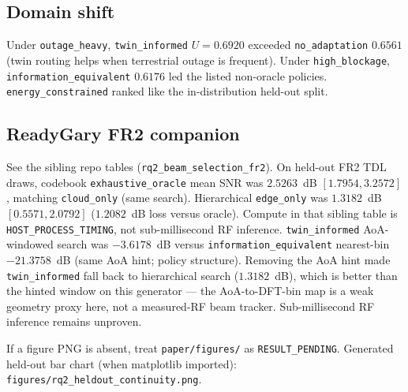 \subsection{Domain shift}


Under \texttt{outage\_heavy}, \texttt{twin\_informed} $U=0.6920$ exceeded \texttt{no\_adaptation} $0.6561$ (twin routing helps when terrestrial outage is frequent).
Under \texttt{high\_blockage}, \texttt{information\_equivalent} $0.6176$ led the listed non-oracle policies.
\texttt{energy\_constrained} ranked like the in-distribution held-out split.

\subsection{ReadyGary FR2 companion}
See the sibling repo tables (\texttt{rq2\_beam\_selection\_fr2}).
On held-out FR2 TDL draws, codebook \texttt{exhaustive\_oracle} mean SNR was $2.5263$~dB $[1.7954,3.2572]$, matching \texttt{cloud\_only} (same search).
Hierarchical \texttt{edge\_only} was $1.3182$~dB $[0.5571,2.0792]$ ($1.2082$~dB loss versus oracle).
Compute in that sibling table is \texttt{HOST\_PROCESS\_TIMING}, not sub-millisecond RF inference.
\texttt{twin\_informed} AoA-windowed search was $-3.6178$~dB versus \texttt{information\_equivalent} nearest-bin $-21.3758$~dB (same AoA hint; policy structure).
Removing the AoA hint made \texttt{twin\_informed} fall back to hierarchical search ($1.3182$~dB), which is better than the hinted window on this generator --- the AoA-to-DFT-bin map is a weak geometry proxy here, not a measured-RF beam tracker.
Sub-millisecond RF inference remains unproven.

If a figure PNG is absent, treat \texttt{paper/figures/} as \texttt{RESULT\_PENDING}.
Generated held-out bar chart (when matplotlib imported): \texttt{figures/rq2\_heldout\_continuity.png}.


